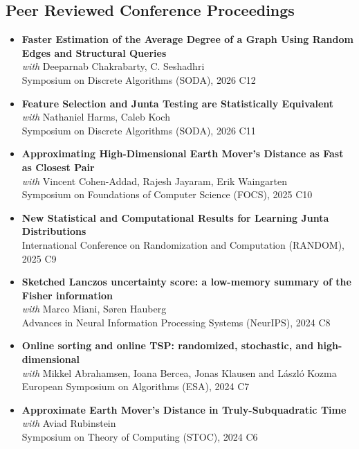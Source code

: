\documentclass[paper=a4,fontsize=11pt]{article} %
\begin{document}
\subsection*{Peer Reviewed Conference Proceedings}
\begin{itemize}[leftmargin=0.5em,itemsep=0.3em,label={}]
    \item \textbf{Faster Estimation of the Average Degree of a Graph Using Random Edges and Structural Queries}\\ 
  \textit{with} Deeparnab Chakrabarty, C. Seshadhri \\
  Symposium on Discrete Algorithms (SODA), 2026 \hfill C12

    \item \textbf{Feature Selection and Junta Testing are Statistically Equivalent}\\ 
  \textit{with} Nathaniel Harms, Caleb Koch  \\
  Symposium on Discrete Algorithms (SODA), 2026 \hfill C11

    \item \textbf{Approximating High-Dimensional Earth Mover's Distance as Fast as Closest Pair}\\ 
  \textit{with} Vincent Cohen-Addad, Rajesh Jayaram, Erik Waingarten \\
    Symposium on Foundations of Computer Science (FOCS), 2025 \hfill C10
    
    \item \textbf{New Statistical and Computational Results for Learning Junta Distributions}\\ 
    International Conference on Randomization and Computation (RANDOM), 2025 \hfill C9
    
    \item \textbf{Sketched Lanczos uncertainty score: a low-memory summary of the Fisher information}\\ 
  \textit{with} Marco Miani, Søren Hauberg \\
    Advances in Neural Information Processing Systems (NeurIPS), 2024 \hfill C8

    \item \textbf{Online sorting and online TSP: randomized, stochastic, and high-dimensional}\\ 
    \textit{with} Mikkel Abrahamsen, Ioana Bercea, Jonas Klausen and László Kozma \\
    European Symposium on Algorithms (ESA), 2024 \hfill C7
    
    \item \textbf{Approximate Earth Mover's Distance in Truly-Subquadratic Time} \\ 
    \textit{with} Aviad Rubinstein \\
    Symposium on Theory of Computing (STOC), 2024 \hfill C6
    

\end{itemize}
\end{document}

